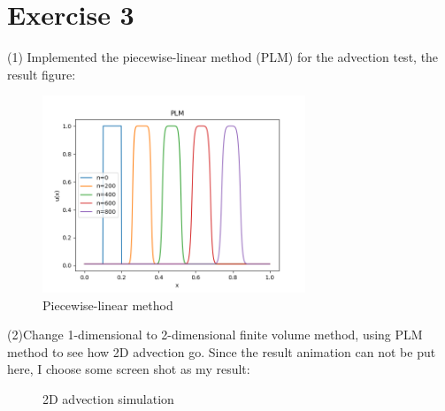 \documentclass[aps,12pt,prd,nofootinbib,bibnotes, amsmath,amssymb,showpacs,superscriptaddress,floatfix]{revtex4-2}
\begin{document}
\section{Exercise 3}
(1) Implemented the piecewise-linear method (PLM) for the advection test, the result figure:
\begin{figure}[H] 
\centering 
\includegraphics[width=0.7\textwidth]{PLM} 
\caption{Piecewise-linear method}  
\end{figure}

(2)Change 1-dimensional to 2-dimensional finite volume method, using PLM method to see how 2D advection go. Since the result animation can not be put here, I choose some screen shot as my result:
\begin{figure}[H]
\centering  
{}
\caption{2D advection simulation}
\end{figure}
\end{document}

